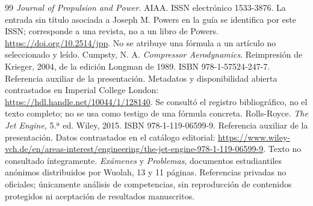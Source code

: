 \documentclass[10pt,openany]{book}
\begin{document}
\begin{thebibliography}{99}
 \emph{Journal of Propulsion and Power}. AIAA. ISSN electrónico 1533-3876. La entrada sin título asociada a Joseph M. Powers en la guía se identifica por este ISSN; corresponde a una revista, no a un libro de Powers. \url{https://doi.org/10.2514/jpp}. No se atribuye una fórmula a un artículo no seleccionado y leído.
 Cumpsty, N. A. \emph{Compressor Aerodynamics}. Reimpresión de Krieger, 2004, de la edición Longman de 1989. ISBN 978-1-57524-247-7. Referencia auxiliar de la presentación. Metadatos y disponibilidad abierta contrastados en Imperial College London: \url{https://hdl.handle.net/10044/1/128140}. Se consultó el registro bibliográfico, no el texto completo; no se usa como testigo de una fórmula concreta.
 Rolls-Royce. \emph{The Jet Engine}, 5.ª ed. Wiley, 2015. ISBN 978-1-119-06599-9. Referencia auxiliar de la presentación. Datos contrastados en el catálogo editorial: \url{https://www.wiley-vch.de/en/areas-interest/engineering/the-jet-engine-978-1-119-06599-9}. Texto no consultado íntegramente.
 \emph{Exámenes} y \emph{Problemas}, documentos estudiantiles anónimos distribuidos por Wuolah, 13 y 11 páginas. Referencias privadas no oficiales; únicamente análisis de competencias, sin reproducción de contenidos protegidos ni aceptación de resultados manuscritos.
\end{thebibliography}
\end{document}
